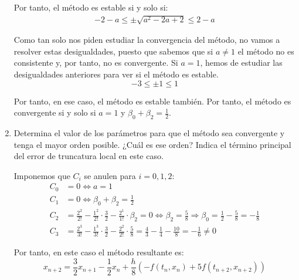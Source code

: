 \begin{ejercicio}
\begin{enumerate}
        Por tanto, el método es estable si y solo si:
        \begin{align*}
            -2-a \leq \pm \sqrt{a^2 - 2a + 2} \leq 2-a
        \end{align*}

        Como tan solo nos piden estudiar la convergencia del método, no vamos a resolver estas desigualdades, puesto que sabemos que si $a\neq 1$ el método no es consistente y, por tanto, no es convergente. Si $a=1$, hemos de estudiar las desigualdades anteriores para ver si el método es estable.
        \begin{equation*}
            -3 \leq \pm 1 \leq 1
        \end{equation*}

        Por tanto, en ese caso, el método es estable también. Por tanto, el método es convergente si y solo si $a=1$ y $\beta_0 + \beta_2 = \frac{1}{2}$.

        \item Determina el valor de los parámetros para que el método sea convergente y tenga el mayor orden posible. ¿Cuál es ese orden? Indica el término principal del error de truncatura local en este caso.
        
        Imponemos que $C_i$ se anulen para $i=0,1,2$:
        \begin{align*}
            C_0 &= 0 \iff a=1 \\
            C_1 &= 0 \iff \beta_0 + \beta_2 = \frac{1}{2} \\
            C_2 &= \frac{2^2}{2!} - \frac{1^2}{2!}\cdot\frac{3}{2} - \frac{2^1}{1!}\cdot\beta_2 = 0 \iff \beta_2 = \frac{5}{8}\Longrightarrow
            \beta_0 = \frac{1}{2} - \frac{5}{8} = -\frac{1}{8}\\
            C_3 &= \frac{2^3}{3!} - \frac{1^3}{3!}\cdot\frac{3}{2} - \frac{2^2}{2!}\cdot\frac{5}{8} = \frac{4}{3} - \frac{1}{4} - \frac{10}{8} = -\frac{1}{6}\neq 0
        \end{align*}

        Por tanto, en este caso el método resultante es:
        \begin{equation*}
            x_{n+2} = \frac{3}{2} x_{n+1} - \frac{1}{2} x_n + \frac{h}{8}\left( -f(t_n, x_n) + 5 f(t_{n+2}, x_{n+2}) \right)
        \end{equation*}


\end{enumerate}
\end{ejercicio}
